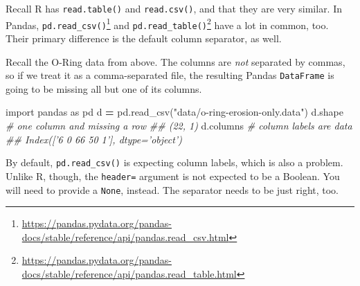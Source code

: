 \documentclass[12pt,krantz2]{krantz}
\makeatletter
\newenvironment{Shaded}{\begin{snugshade}}{\end{snugshade}}
\newcommand{\CommentTok}[1]{\textcolor[rgb]{0.37,0.37,0.37}{\textit{#1}}}
\newcommand{\ImportTok}[1]{#1}
\newcommand{\NormalTok}[1]{#1}
\newcommand{\OperatorTok}[1]{\textcolor[rgb]{0.43,0.43,0.43}{\textbf{#1}}}
\newcommand{\StringTok}[1]{\textcolor[rgb]{0.5,0.5,0.5}{#1}}
\renewcommand{\href}[2]{#2\footnote{\url{#1}}}
\newenvironment{kframe}{%
\medskip{}
\setlength{\fboxsep}{.8em}
 \def\at@end@of@kframe{}%
 \ifinner\ifhmode%
  \def\at@end@of@kframe{\end{minipage}}%
  \begin{minipage}{\columnwidth}%
 \fi\fi%
 \def\FrameCommand##1{\hskip\@totalleftmargin \hskip-\fboxsep
 \colorbox{shadecolor}{##1}\hskip-\fboxsep
     \hskip-\linewidth \hskip-\@totalleftmargin \hskip\columnwidth}%
 \MakeFramed {\advance\hsize-\width
   \@totalleftmargin\z@ \linewidth\hsize
   \@setminipage}}%
 {\par\unskip\endMakeFramed%
 \at@end@of@kframe}
\renewenvironment{Shaded}{\begin{kframe}}{\end{kframe}}
\makeatother
\begin{document}
Recall R has \texttt{read.table()} and \texttt{read.csv()}, and that they are very similar. In Pandas, \href{https://pandas.pydata.org/pandas-docs/stable/reference/api/pandas.read_csv.html}{\texttt{pd.read\_csv()}} and \href{https://pandas.pydata.org/pandas-docs/stable/reference/api/pandas.read_table.html}{\texttt{pd.read\_table()}} have a lot in common, too. Their primary difference is the default column separator, as well.

Recall the O-Ring data from above. The columns are \emph{not} separated by commas, so if we treat it as a comma-separated file, the resulting Pandas \texttt{DataFrame} is going to be missing all but one of its columns.

\begin{Shaded}
\begin{Highlighting}[]
\ImportTok{import}\NormalTok{ pandas }\ImportTok{as}\NormalTok{ pd}
\NormalTok{d }\OperatorTok{=}\NormalTok{ pd.read_csv(}\StringTok{"data/o-ring-erosion-only.data"}\NormalTok{)}
\NormalTok{d.shape }\CommentTok{# one column and missing a row}
\CommentTok{## (22, 1)}
\NormalTok{d.columns }\CommentTok{# column labels are data}
\CommentTok{## Index(['6 0 66  50  1'], dtype='object')}
\end{Highlighting}
\end{Shaded}

By default, \texttt{pd.read\_csv()} is expecting column labels, which is also a problem. Unlike R, though, the \texttt{header=} argument is not expected to be a Boolean. You will need to provide a \texttt{None}, instead. The separator needs to be just right, too.
\end{document}
